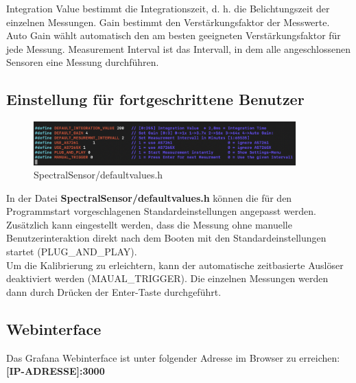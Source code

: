 \noindent Integration Value bestimmt die Integrationszeit, d. h. die Belichtungszeit der einzelnen Messungen.
Gain bestimmt den Verstärkungsfaktor der Messwerte. Auto Gain wählt automatisch den am besten geeigneten Verstärkungsfaktor für jede Messung.
Measurement Interval ist das Intervall, in dem alle angeschlossenen Sensoren eine Messung durchführen.
\subsection{Einstellung für fortgeschrittene Benutzer}
 \begin{figure}[H]
\centering
\includegraphics[width=0.9\textwidth]{img/advanced_setting}
\caption{SpectralSensor/defaultvalues.h}
\label{fig:changesettings}
\end{figure}
 In der Datei \textbf{SpectralSensor/defaultvalues.h} können die für den Programmstart vorgeschlagenen Standardeinstellungen angepasst werden.\\
 Zusätzlich kann eingestellt werden, dass die Messung ohne manuelle Benutzerinteraktion direkt nach dem Booten mit den Standardeinstellungen startet (PLUG\_AND\_PLAY).\\
 Um die Kalibrierung zu erleichtern, kann der automatische zeitbasierte Auslöser deaktiviert werden (MAUAL\_TRIGGER). Die einzelnen Messungen werden dann durch Drücken der Enter-Taste durchgeführt.
 


\subsection{Webinterface}
Das Grafana Webinterface ist unter folgender Adresse im Browser zu erreichen:\\
\textbf{[IP-ADRESSE]:3000}

